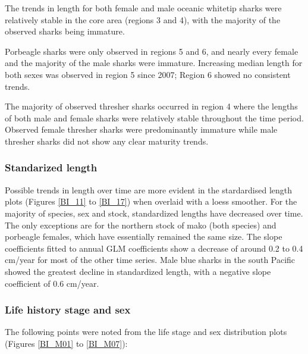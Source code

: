 \documentclass[12pt]{SCreport}
\begin{document}
The trends in length for both female and male oceanic whitetip sharks were relatively stable in the core area (regions 3 and 4), with the majority of the observed sharks being immature.  

Porbeagle sharks were only observed in regions 5 and 6, and nearly every female and the majority of the male sharks were immature.  Increasing median length for both sexes was observed in region 5 since 2007; Region 6 showed no consistent trends.

The majority of observed thresher sharks occurred in region 4 where the lengths of both male and female sharks were relatively stable throughout the time period. Observed female thresher sharks were predominantly immature while male thresher sharks did not show any clear maturity trends.

\subsubsection{Standarized length}
Possible trends in length over time are more evident in the stardardised length plots (Figures \ref{BI_11} to \ref{BI_17}) when overlaid with a loess smoother.  For the majority of species, sex and stock, standardized lengths have decreased over time.  The only exceptions are for the northern stock of mako (both species) and porbeagle females, which have essentially remained the same size.  The slope coefficients fitted to annual GLM coefficients show a decrease of around 0.2 to 0.4 cm/year for most of the other time series.  Male blue sharks in the south Pacific showed the greatest decline in standardized length, with a negative slope coefficient of 0.6 cm/year.

\subsubsection{Life history stage and sex}
The following points were noted from the life stage and sex distribution plots (Figures \ref{BI_M01} to \ref{BI_M07}):
 
\end{document}
